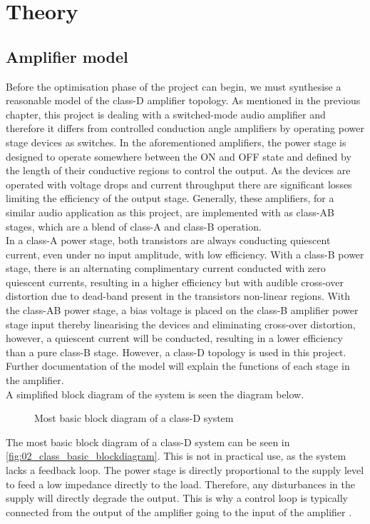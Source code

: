 \chapter[Theory]{Theory} \label{cha:theory}
\section{Amplifier model} \label{sec:theory_amplifier_model}
Before the optimisation phase of the project can begin, we must synthesise a reasonable model of the class-D amplifier topology. As mentioned in the previous chapter, this project is dealing with a switched-mode audio amplifier and therefore it differs from controlled conduction angle amplifiers by operating power stage devices as switches. In the aforementioned amplifiers, the power stage is designed to operate somewhere between the ON and OFF state and defined by the length of their conductive regions to control the output. As the devices are operated with voltage drops and current throughput there are significant losses limiting the efficiency of the output stage. Generally, these amplifiers, for a similar audio application as this project, are implemented with as class-AB stages, which are a blend of class-A and class-B operation. \\
In a class-A power stage, both transistors are always conducting quiescent current, even under no input amplitude, with low efficiency. With a class-B power stage, there is an alternating complimentary current conducted with zero quiescent currents, resulting in a higher efficiency but with audible cross-over distortion due to dead-band present in the transistors non-linear regions. With the class-AB power stage, a bias voltage is placed on the class-B amplifier power stage input thereby linearising the devices and eliminating cross-over distortion, however, a quiescent current will be conducted, resulting in a lower efficiency than a pure class-B stage. However, a class-D topology is used in this project. Further documentation of the model will explain the functions of each stage in the amplifier. \\

A simplified block diagram of the system is seen the diagram below.
\begin{figure}[htbp]
	\centering
	
	\caption{Most basic block diagram of a class-D system}
	\label{fig:02_class_basic_blockdiagram}
\end{figure}

The most basic block diagram of a class-D system can be seen in \autoref{fig:02_class_basic_blockdiagram}. This is not in practical use, as the system lacks a feedback loop. The power stage is directly proportional to the supply level to feed a low impedance directly to the load. Therefore, any disturbances in the supply will directly degrade the output. This is why a control loop is typically connected from the output of the amplifier going to the input of the amplifier \cite{self_osc_pwm_modulators_topo_comp}. \\

